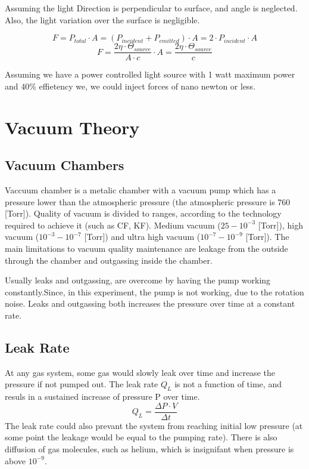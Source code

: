 \documentclass[\main/master.tex]{subfiles}
\begin{document}
Assuming the light Direction is perpendicular to surface, and angle is neglected. Also, the light variation over the surface is negligible.

\begin{equation}
F = P_{total}\cdot A = (P_{incident}+P_{emitted})\cdot A = 2\cdot P_{incident}\cdot A\label{eqn:energy-mass-equivalence-relation}
\end{equation}
\begin{equation}
F = \frac{2\eta\cdot\Theta_{source}}{{A\cdot c}}\cdot A = \frac{2\eta\cdot\Theta_{source}}{{c}} \label{eqn:energy-mass-equivalence-relation}
\end{equation}

Assuming we have a power controlled light source with 1 watt maximum power and 40\% effietency we, we could inject forces of nano newton or less.  

 

\section{Vacuum Theory}
\subsection{Vacuum Chambers}
Vaccuum chamber is a metalic chamber with a vacuum pump which has a pressure lower than the atmospheric pressure (the atmospheric pressure is 760 [Torr]). Quality of vacuum is divided to ranges, according to the technology required to achieve it (such as CF, KF). Medium vacuum ($25-10^{-3}$ [Torr]), high vacuum ($10^{-3}-10^{-7}$ [Torr]) and ultra high vacuum ($10^{-7}-10^{-9}$ [Torr]). The main limitations to vacuum quality maintenance are leakage from the outside through the chamber and outgassing inside the chamber.
\par
Usually leaks and outgassing, are overcome by having the pump working constantly.Since, in this experiment, the pump is not working, due to the rotation noise. Leaks and outgassing both increases the pressure over time at a constant rate.  

\subsection{Leak Rate}
At any gas system, some gas would slowly leak over time and increase the pressure if not pumped out. The leak rate $Q_L$ is not a function of time, and resuls in a sustained increase of pressure P over time.
\begin{equation}
Q_L = \frac{\Delta P\cdot V}{\Delta t}  \label{eqn:energy-mass-equivalence-relation}
\end{equation}
The leak rate could also prevant the system from reaching initial low pressure (at some point the leakage would be equal to the pumping rate).
There is also diffusion of gas molecules, such as helium, which is insignifant when pressure is above $10^{-9}$. 
\end{document}
